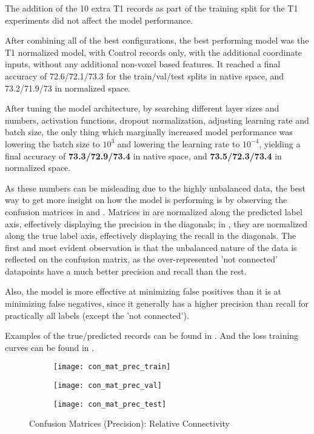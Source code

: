 The addition of the 10 extra T1 records as part of the training split for the T1 experiments did not affect the model performance.\par
After combining all of the best configurations, the best performing model was the T1 normalized model, with Control records only, with the additional coordinate inputs, without any additional non-voxel based features. It reached a final accuracy of 72.6/72.1/73.3 for the train/val/test splits in native space, and 73.2/71.9/73 in normalized space.\par
After tuning the model architecture, by searching different layer sizes and numbers, activation functions, dropout normalization, adjusting learning rate and batch size, the only thing which marginally increased model performance was lowering the batch size to $10^3$ and lowering the learning rate to $10^{-4}$, yielding a final accuracy of \textbf{73.3/72.9/73.4} in native space, and \textbf{73.5/72.3/73.4} in normalized space.\par
As these numbers can be misleading due to the highly unbalanced data, the best way to get more insight on how the model is performing is by observing the confusion matrices in  and . Matrices in  are normalized along the predicted label axis, effectively displaying the precision in the diagonals; in , they are normalized along the true label axis, effectively displaying the recall in the diagonals. The first and most evident observation is that the unbalanced nature of the data is reflected on the confusion matrix, as the over-represented 'not connected' datapoints have a much better precision and recall than the rest.\par
Also, the model is more effective at minimizing false positives than it is at minimizing false negatives, since it generally has a higher precision than recall for practically all labels (except the 'not connected').\par
Examples of the true/predicted records can be found in  . And the loss training curves can be found in .

\begin{figure}[H]
\centering
\begin{subfigure}{0.49\textwidth}
  \centering
  \texttt{[image: con\_mat\_prec\_train]}
\end{subfigure}
\hfill
\begin{subfigure}{0.49\textwidth}
  \centering
  \texttt{[image: con\_mat\_prec\_val]}
\end{subfigure}
\begin{subfigure}{0.49\textwidth}
  \centering
  \texttt{[image: con\_mat\_prec\_test]}
\end{subfigure}
\caption{Confusion Matrices (Precision): Relative Connectivity}
\label{fig:conf_prec}
\end{figure}

